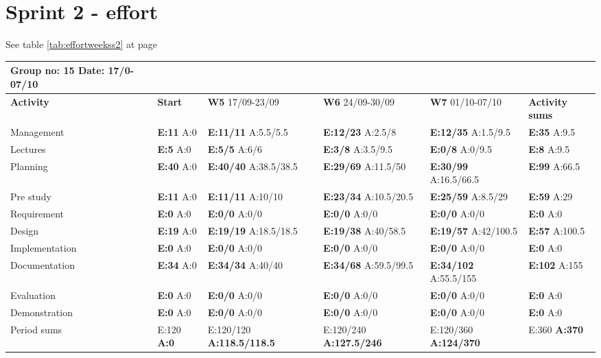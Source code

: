 \section{Sprint 2 - effort}

See table \ref{tab:effortweekss2} at page \pageref{tab:effortweekss2}
\begin{table}
\begin{tabularx}{\linewidth}{>{\setlength\hsize{.625\hsize}}X|>{\setlength\hsize{0.3\hsize}}X|>{\setlength\hsize{0.5\hsize}}X|>{\setlength\hsize{0.5\hsize}}X|>{\setlength\hsize{0.5\hsize}}X|>{\setlength\hsize{.3\hsize}}X}
Group no: 15 Date: 17/0-07/10  \\ \hline
\textbf{Activity} & \textbf{Start} & \textbf{W5} 17/09-23/09 & \textbf{W6} 24/09-30/09 & \textbf{W7} 01/10-07/10 & \textbf{Activity sums} \\ \hline \hline
Management & \textbf{E:11} A:0 & \textbf{E:11/11} A:5.5/5.5 & \textbf{E:12/23} A:2.5/8 & \textbf{E:12/35} A:1.5/9.5 & \textbf{E:35} A:9.5  \\ \hline
Lectures & \textbf{E:5} A:0 & \textbf{E:5/5} A:6/6 & \textbf{E:3/8} A:3.5/9.5 & \textbf{E:0/8} A:0/9.5 & \textbf{E:8 } A:9.5  \\ \hline
Planning & \textbf{E:40} A:0 & \textbf{E:40/40} A:38.5/38.5 & \textbf{E:29/69} A:11.5/50 & \textbf{E:30/99} A:16.5/66.5 & \textbf{E:99 } A:66.5  \\ \hline
Pre study & \textbf{E:11} A:0 & \textbf{E:11/11} A:10/10 & \textbf{E:23/34} A:10.5/20.5 & \textbf{E:25/59} A:8.5/29 & \textbf{E:59} A:29  \\ \hline
Requirement & \textbf{E:0} A:0 & \textbf{E:0/0} A:0/0 & \textbf{E:0/0} A:0/0 & \textbf{E:0/0} A:0/0 & \textbf{E:0} A:0  \\ \hline
Design & \textbf{E:19} A:0 & \textbf{E:19/19} A:18.5/18.5 & \textbf{E:19/38} A:40/58.5 & \textbf{E:19/57} A:42/100.5 & \textbf{E:57} A:100.5  \\ \hline
Implementation & \textbf{E:0} A:0 & \textbf{E:0/0} A:0/0 & \textbf{E:0/0} A:0/0 & \textbf{E:0/0} A:0/0 & \textbf{E:0} A:0  \\ \hline
Documentation & \textbf{E:34} A:0 & \textbf{E:34/34} A:40/40 & \textbf{E:34/68} A:59.5/99.5 & \textbf{E:34/102} A:55.5/155 & \textbf{E:102 } A:155  \\ \hline
Evaluation & \textbf{E:0} A:0 & \textbf{E:0/0} A:0/0 & \textbf{E:0/0} A:0/0 & \textbf{E:0/0} A:0/0 & \textbf{E:0 } A:0  \\ \hline
Demonstration & \textbf{E:0} A:0 & \textbf{E:0/0} A:0/0 & \textbf{E:0/0} A:0/0 & \textbf{E:0/0} A:0/0 & \textbf{E:0 } A:0  \\ \hline
Period sums & E:120 \textbf{A:0} & E:120/120 \textbf{A:118.5/118.5} & E:120/240 \textbf{A:127.5/246} & E:120/360 \textbf{A:124/370} & E:360 \textbf{A:370}
\end{tabularx}


\end{table}
